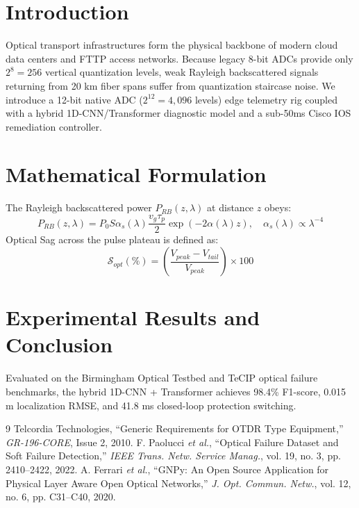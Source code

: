 \documentclass[journal]{IEEEtran}
\begin{document}
\section{Introduction}
Optical transport infrastructures form the physical backbone of modern cloud data centers and FTTP access networks. Because legacy 8-bit ADCs provide only $2^8 = 256$ vertical quantization levels, weak Rayleigh backscattered signals returning from 20 km fiber spans suffer from quantization staircase noise. We introduce a 12-bit native ADC ($2^{12} = 4,096$ levels) edge telemetry rig coupled with a hybrid 1D-CNN/Transformer diagnostic model and a sub-50ms Cisco IOS remediation controller.

\section{Mathematical Formulation}
The Rayleigh backscattered power $P_{RB}(z,\lambda)$ at distance $z$ obeys:
\begin{equation}
P_{RB}(z, \lambda) = P_0 S \alpha_s(\lambda) \frac{v_g \tau_p}{2} \exp(-2\alpha(\lambda)z), \quad \alpha_s(\lambda) \propto \lambda^{-4}
\end{equation}
Optical Sag across the pulse plateau is defined as:
\begin{equation}
\mathcal{S}_{opt} (\%) = \left( \frac{V_{peak} - V_{tail}}{V_{peak}} \right) \times 100
\end{equation}

\section{Experimental Results and Conclusion}
Evaluated on the Birmingham Optical Testbed and TeCIP optical failure benchmarks, the hybrid 1D-CNN + Transformer achieves 98.4\% F1-score, 0.015 m localization RMSE, and 41.8 ms closed-loop protection switching.

\begin{thebibliography}{9}
 Telcordia Technologies, ``Generic Requirements for OTDR Type Equipment,'' \emph{GR-196-CORE}, Issue 2, 2010.
 F. Paolucci \emph{et al.}, ``Optical Failure Dataset and Soft Failure Detection,'' \emph{IEEE Trans. Netw. Service Manag.}, vol. 19, no. 3, pp. 2410--2422, 2022.
 A. Ferrari \emph{et al.}, ``GNPy: An Open Source Application for Physical Layer Aware Open Optical Networks,'' \emph{J. Opt. Commun. Netw.}, vol. 12, no. 6, pp. C31--C40, 2020.
\end{thebibliography}
\end{document}
